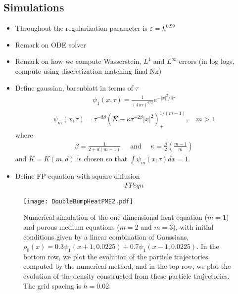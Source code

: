\documentclass[11pt,leqno]{amsart}
\theoremstyle{definition}
\def\epsilon{\varepsilon}
\begin{document}
\subsection{Simulations} \label{simulations}
\begin{itemize}
\item Throughout  the regularization parameter is $\epsilon = h^{0.99}$
\item Remark on ODE solver
\item Remark on how we compute Wasserstein, $L^1$ and $L^\infty$ errors (in log logs, compute using discretization matching final Nx)
\end{itemize}

\begin{itemize}
\item Define gaussian, barenblatt in terms of $\tau$
\begin{align} \label{gaussian}
\psi_{1}(x,\tau) = \frac{1}{(4\pi \tau)^{d/2}} e^{-|x|^2/4 \tau}
\end{align}
\begin{align} \label{barenblatt}
\psi_{m}(x,\tau) = \tau^{-d\beta}(K - \kappa \tau^{-2\beta} |x|^2)_+^{1/(m-1)} , \quad m>1
\end{align}
where
\begin{align*}
\beta = \frac{1}{2+d(m-1)} \quad \text{ and } \quad \kappa = \frac{\beta}{2} \left( \frac{m-1}{m} \right) \end{align*}
and $ K = K(m,d)$ is chosen so that $\int \psi_{m}(x,\tau) dx = 1$.
\item Define FP equation with square diffusion
\begin{align} \label{FPeqn}
FP eqn
\end{align}
\end{itemize}


\begin{figure}[!ht]
\centering
\hspace*{-1.4cm}
\texttt{[image: DoubleBumpHeatPME2.pdf]}
	\caption{Numerical simulation of the one dimensional heat equation ($m=1$) and porous medium equations ($m=2$ and $m=3$), with initial conditions given by a linear combination of Gaussians, $\rho_0(x) = 0.3 \psi_1(x+1,0.0225)+0.7 \psi_1(x-1, 0.0225)$. In the bottom row, we plot the evolution of the particle trajectories computed by the numerical method, and in the top row, we plot the evolution of the density constructed from these particle trajectories. The grid spacing is $h = 0.02$. 
}
\end{figure}
\end{document}
